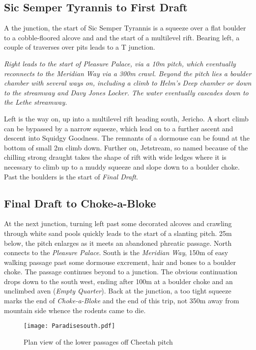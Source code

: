\subsection{Sic Semper Tyrannis to First Draft}
A the junction, the start of Sic Semper Tyrannis is a squeeze over a flat boulder to a cobble-floored alcove and and the start of a multilevel rift. Bearing left, a couple of traverses over pits leads to a T junction. 

\textit{Right leads to the start of \emph{Pleasure Palace}, via a 10m pitch, which eventually reconnects to the \emph{Meridian Way} via a 300m crawl. Beyond the pitch lies a boulder chamber with several ways on, including a climb to \emph{Helm's Deep} chamber or down to the streamway and \emph{Davy Jones Locker}. The water eventually cascades down to the \emph{Lethe} streamway.}

Left is the way on, up into a multilevel rift heading south, Jericho. A short climb can be bypassed by a narrow squeeze, which lead on to a further ascent and descent into Squidgy Goodness. The remnants of a dormouse can be found at the bottom of small 2m climb down. Further on, Jetstream, so named because of the chilling strong draught takes the shape of rift with wide ledges where it is necessary to climb up to a muddy squeeze and slope down to a boulder choke. Past the boulders is the start of \emph{Final Draft}.

\subsection{Final Draft to Choke-a-Bloke}
At the next junction, turning left past some decorated alcoves and crawling through white sand pools quickly leads to the start of a slanting pitch. 25m below, the pitch enlarges as it meets an abandoned phreatic passage. North connects to the \emph{Pleasure Palace}. South is the \emph{Meridian Way}, 150m of easy walking passage past some dormouse excrement, hair and bones to a boulder choke. The passage continues beyond to a junction. The obvious continuation drops down to the south west, ending after 100m at a boulder choke and an unclimbed aven (\emph{Empty Quarter}). Back at the junction, a too tight squeeze marks the end of \emph{Choke-a-Bloke} and the end of this trip, not 350m away from mountain side whence the rodents came to die.



\begin{figure*}[t!]
\checkoddpage \ifoddpage \forcerectofloat \else \forceversofloat \fi
\centering
\texttt{[image: Paradisesouth.pdf]}
\caption{Plan view of the lower passages off Cheetah pitch}
\label{paradise}
\end{figure*}